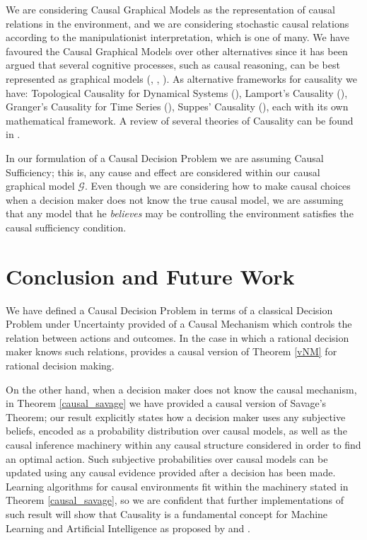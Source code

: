 \documentclass{article}
\theoremstyle{plain}
\begin{document}
We are considering Causal Graphical Models as the representation of causal relations in the environment, and we are considering stochastic causal relations according to the manipulationist interpretation, which is one of many. We have favoured the Causal Graphical Models over other alternatives since it has been argued that several cognitive processes, such as causal reasoning, can be best represented as graphical models (\cite{chater2013programs}, \cite{danks2014unifying}, \cite{sloman2015causality}). As alternative frameworks for causality we have: Topological Causality for Dynamical Systems (\cite{harnack2017topological}), Lamport's Causality (\cite{lamport1978time}), Granger's Causality for Time Series (\cite{granger1969investigating}), Suppes' Causality (\cite{suppes1970probabilistic}), each with its own mathematical framework. A review of several theories of Causality can be found in \cite{holland1985statistics}.

In our formulation of a Causal Decision Problem we are assuming Causal Sufficiency; this is, any cause and effect are considered within our causal graphical model $\mathcal{G}$. Even though we are considering how to make causal choices when a decision maker does not know the true causal model, we are assuming that any model that he \textit{believes} may be controlling the environment satisfies the causal sufficiency condition.
\section{Conclusion and Future Work}
We have defined a Causal Decision Problem in terms of a classical Decision Problem under Uncertainty provided of a Causal Mechanism which controls the relation between actions and outcomes. In the case in which a rational decision maker knows such relations, \cite{pearl2009causality} provides a causal version of Theorem \ref{vNM} for rational decision making. 

On the other hand, when a decision maker does not know the causal mechanism, in Theorem \ref{causal_savage} we have provided a causal version of Savage's Theorem; our result explicitly states how a decision maker uses any subjective beliefs, encoded as a probability distribution over causal models, as well as the causal inference machinery within any causal structure considered in order to find an optimal action. Such subjective probabilities over causal models can be updated using any causal evidence provided after a decision has been made. Learning algorithms for causal environments fit within the machinery stated in Theorem \ref{causal_savage}, so we are confident that further implementations of such result will show that Causality is a fundamental concept for Machine Learning and Artificial Intelligence as proposed by \cite{lake2017building} and \cite{pearl2018why}.



\end{document}
